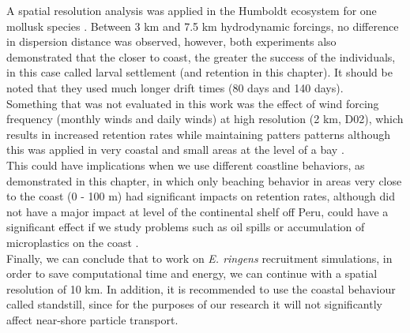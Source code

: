 A spatial resolution analysis was applied in the Humboldt ecosystem for one mollusk species \citep{GaraKapl2014}. Between 3 km and 7.5 km hydrodynamic forcings, no difference in dispersion distance was observed, however, both experiments also demonstrated that the closer to coast, the greater the success of the individuals, in this case called larval settlement (and retention in this chapter). It should be noted that they used much longer drift times (80 days and 140 days).\\

Something that was not evaluated in this work was the effect of wind forcing frequency (monthly winds and daily winds) at high resolution (2 km, D02), which results in increased retention rates while maintaining patters patterns although this was applied in very coastal and small areas at the level of a bay \citep{FlorTam2019}.\\

This could have implications when we use different coastline behaviors, as demonstrated in this chapter, in which only beaching behavior in areas very close to the coast (0 - 100 m) had significant impacts on retention rates, although did not have a major impact at level of the continental shelf off Peru, could have a significant effect if we study problems such as oil spills or accumulation of microplastics on the coast \citep{AtwoFalc2019,LopeNajj2021}.\\

Finally, we can conclude that to work on \textit{E. ringens} recruitment simulations, in order to save computational time and energy, we can continue with a spatial resolution of 10 km. In addition, it is recommended to use the coastal behaviour called standstill, since for the purposes of our research it will not significantly affect near-shore particle transport.\\

\clearpage